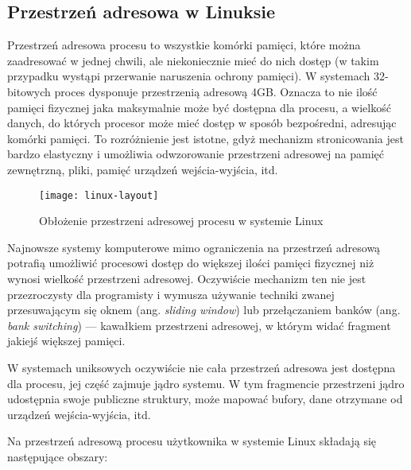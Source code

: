 \documentclass[12pt,a4paper,titlepage,twoside]{mwart}
\begin{document}
\subsection{Przestrzeń adresowa w Linuksie}

Przestrzeń adresowa procesu to wszystkie komórki pamięci, które można
zaadresować w jednej chwili, ale niekoniecznie mieć do nich dostęp (w takim
przypadku wystąpi przerwanie naruszenia ochrony pamięci). W systemach
32-bitowych proces dysponuje przestrzenią adresową 4GB. Oznacza to nie ilość
pamięci fizycznej jaka maksymalnie może być dostępna dla procesu, a wielkość
danych, do których procesor może mieć dostęp w sposób bezpośredni, adresując
komórki pamięci. To rozróżnienie jest istotne, gdyż mechanizm stronicowania
jest bardzo elastyczny i umożliwia odwzorowanie przestrzeni adresowej na pamięć
zewnętrzną, pliki, pamięć urządzeń wejścia-wyjścia, itd.

\begin{figure}[h]
\centering
\texttt{[image: linux-layout]}
\caption{Obłożenie przestrzeni adresowej procesu w systemie Linux}
\end{figure}

Najnowsze systemy komputerowe mimo ograniczenia na przestrzeń adresową potrafią
umożliwić procesowi dostęp do większej ilości pamięci fizycznej niż wynosi
wielkość przestrzeni adresowej. Oczywiście mechanizm ten nie jest przezroczysty
dla programisty i wymusza używanie techniki zwanej przesuwającym się oknem
(ang. \textit{sliding window}) lub przełączaniem banków (ang. \textit{bank
switching}) --- kawałkiem przestrzeni adresowej, w którym widać fragment jakiejś
większej pamięci.

W systemach uniksowych oczywiście nie cała przestrzeń adresowa jest dostępna
dla procesu, jej część zajmuje jądro systemu. W tym fragmencie przestrzeni
jądro udostępnia swoje publiczne struktury, może mapować bufory, dane otrzymane
od urządzeń wejścia-wyjścia, itd.

Na przestrzeń adresową procesu użytkownika w systemie Linux składają się
następujące obszary:
\end{document}
